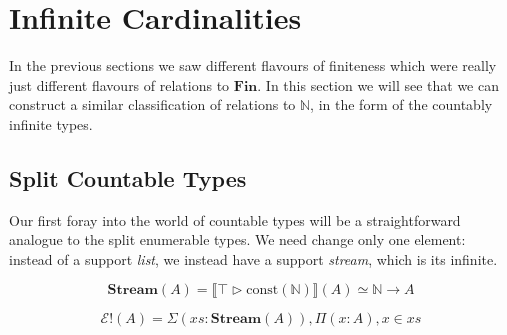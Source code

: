 \section{Infinite Cardinalities} \label{infinite-cardinalities}
In the previous sections we saw different flavours of finiteness which were
really just different flavours of relations to \(\mathbf{Fin}\).
In this section we will see that we can construct a similar classification of
relations to \(\mathbb{N}\), in the form of the countably infinite types.
\subsection{Split Countable Types}
Our first foray into the world of countable types will be a straightforward
analogue to the split enumerable types.
We need change only one element: instead of a support \emph{list}, we instead
have a support \emph{stream}, which is its infinite.
\begin{rm-definition}[Stream]
  \begin{equation}
    \mathbf{Stream}(A) = \llbracket \top \triangleright \text{const} (\mathbb{N}) \rrbracket(A) \simeq \mathbb{N} \rightarrow A
  \end{equation}
\end{rm-definition}
\begin{rm-definition}
  \begin{equation}
    \mathcal{E}!(A) = \Sigma {(\mathit{xs} : \mathbf{Stream}(A))} , \Pi {(x : A)} , x \in \mathit{xs}
  \end{equation}
\end{rm-definition}
